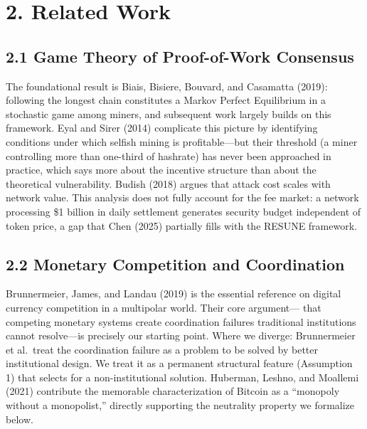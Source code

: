 \documentclass[12pt]{article}
\theoremstyle{definition}
\theoremstyle{remark}
\begin{document}
\newpage


\section{2. Related Work}

\subsection{2.1 Game Theory of Proof-of-Work Consensus}

The foundational result is Biais, Bisiere, Bouvard, and Casamatta (2019):
following the longest chain constitutes a Markov Perfect Equilibrium in
a stochastic game among miners, and subsequent work largely builds on
this framework. Eyal and Sirer (2014) complicate
this picture by identifying conditions under which selfish mining is
profitable---but their threshold (a miner controlling more than one-third
of hashrate) has never been approached in practice, which says more about
the incentive structure than about the theoretical vulnerability. Budish
(2018) argues that attack cost scales with network value. This analysis
does not fully account for the fee market: a network processing \$1 billion in daily settlement
generates security budget independent of token price, a gap that Chen
(2025) partially fills with the RESUNE framework.

\subsection{2.2 Monetary Competition and Coordination}

Brunnermeier, James, and Landau (2019) is the essential reference on
digital currency competition in a multipolar world. Their core argument---
that competing monetary systems create coordination failures traditional
institutions cannot resolve---is precisely our starting point. Where we
diverge: Brunnermeier et al.\ treat the coordination failure as a problem
to be solved by better institutional design. We treat it as a permanent
structural feature (Assumption 1) that selects for a non-institutional
solution. Huberman, Leshno, and Moallemi (2021) contribute the memorable
characterization of Bitcoin as a ``monopoly without a monopolist,''
directly supporting the neutrality property we formalize below.
\end{document}
